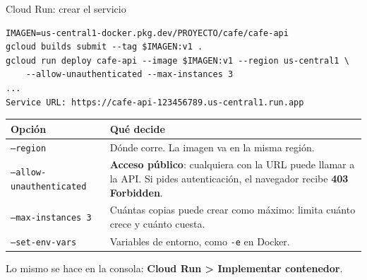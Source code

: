 \documentclass[aspectratio=169,10pt,c]{beamer}
\begin{document}
\begin{frame}[fragile]{Cloud Run: crear el servicio}
\begin{lstlisting}[style=terminal,basicstyle=\ttfamily\footnotesize\color{white}]
IMAGEN=us-central1-docker.pkg.dev/PROYECTO/cafe/cafe-api
gcloud builds submit --tag $IMAGEN:v1 .
gcloud run deploy cafe-api --image $IMAGEN:v1 --region us-central1 \
    --allow-unauthenticated --max-instances 3
...
Service URL: https://cafe-api-123456789.us-central1.run.app
\end{lstlisting}
\vspace{1mm}
\renewcommand{\arraystretch}{1.2}
\small
\begin{tabular}{@{}>{\raggedright\arraybackslash}p{4.1cm}>{\raggedright\arraybackslash}p{8.7cm}@{}}
\toprule
\textbf{Opción} & \textbf{Qué decide}\\
\midrule
\texttt{--region} & Dónde corre. La imagen va en la misma región.\\
\texttt{--allow-unauthenticated} & \textbf{Acceso público}: cualquiera con la URL puede llamar a la API. Si pides autenticación, el navegador recibe \textbf{403 Forbidden}.\\
\texttt{--max-instances 3} & Cuántas copias puede crear como máximo: limita cuánto crece y cuánto cuesta.\\
\texttt{--set-env-vars} & Variables de entorno, como \texttt{-e} en Docker.\\
\bottomrule
\end{tabular}
\vspace{1mm}

{\scriptsize Lo mismo se hace en la consola: \textbf{Cloud Run > Implementar contenedor}.}
\end{frame}
\end{document}
